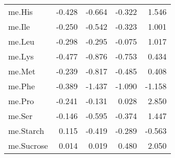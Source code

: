 \begin{tabular}{lrrrr}
me.His & {\cellcolor[HTML]{AAB8D0}} \color[HTML]{000000} -0.428 & {\cellcolor[HTML]{7997C1}} \color[HTML]{F1F1F1} -0.664 & {\cellcolor[HTML]{BFC8D8}} \color[HTML]{000000} -0.322 & {\cellcolor[HTML]{A9373B}} \color[HTML]{F1F1F1} 1.546 \\
me.Ile & {\cellcolor[HTML]{CFD4E0}} \color[HTML]{000000} -0.250 & {\cellcolor[HTML]{92A7C8}} \color[HTML]{F1F1F1} -0.542 & {\cellcolor[HTML]{BFC8D8}} \color[HTML]{000000} -0.323 & {\cellcolor[HTML]{A9373B}} \color[HTML]{F1F1F1} 1.001 \\
me.Leu & {\cellcolor[HTML]{C3CBDA}} \color[HTML]{000000} -0.298 & {\cellcolor[HTML]{C5CDDB}} \color[HTML]{000000} -0.295 & {\cellcolor[HTML]{F2F0F2}} \color[HTML]{000000} -0.075 & {\cellcolor[HTML]{A9373B}} \color[HTML]{F1F1F1} 1.017 \\
me.Lys & {\cellcolor[HTML]{9FB0CC}} \color[HTML]{000000} -0.477 & {\cellcolor[HTML]{4879BC}} \color[HTML]{F1F1F1} -0.876 & {\cellcolor[HTML]{658ABE}} \color[HTML]{F1F1F1} -0.753 & {\cellcolor[HTML]{D9A5A2}} \color[HTML]{000000} 0.434 \\
me.Met & {\cellcolor[HTML]{D0D5E0}} \color[HTML]{000000} -0.239 & {\cellcolor[HTML]{5782BC}} \color[HTML]{F1F1F1} -0.817 & {\cellcolor[HTML]{9DAFCB}} \color[HTML]{000000} -0.485 & {\cellcolor[HTML]{DAA9A7}} \color[HTML]{000000} 0.408 \\
me.Phe & {\cellcolor[HTML]{B2BED3}} \color[HTML]{000000} -0.389 & {\cellcolor[HTML]{2369BD}} \color[HTML]{F1F1F1} -1.437 & {\cellcolor[HTML]{2369BD}} \color[HTML]{F1F1F1} -1.090 & {\cellcolor[HTML]{2369BD}} \color[HTML]{F1F1F1} -1.158 \\
me.Pro & {\cellcolor[HTML]{D0D5E0}} \color[HTML]{000000} -0.241 & {\cellcolor[HTML]{E7E7EC}} \color[HTML]{000000} -0.131 & {\cellcolor[HTML]{FAF3F3}} \color[HTML]{000000} 0.028 & {\cellcolor[HTML]{A9373B}} \color[HTML]{F1F1F1} 2.850 \\
me.Ser & {\cellcolor[HTML]{E4E5EB}} \color[HTML]{000000} -0.146 & {\cellcolor[HTML]{87A0C4}} \color[HTML]{F1F1F1} -0.595 & {\cellcolor[HTML]{B5C0D4}} \color[HTML]{000000} -0.374 & {\cellcolor[HTML]{A9373B}} \color[HTML]{F1F1F1} 1.447 \\
me.Starch & {\cellcolor[HTML]{F5E5E4}} \color[HTML]{000000} 0.115 & {\cellcolor[HTML]{ABB9D0}} \color[HTML]{000000} -0.419 & {\cellcolor[HTML]{C5CDDB}} \color[HTML]{000000} -0.289 & {\cellcolor[HTML]{8DA4C6}} \color[HTML]{F1F1F1} -0.563 \\
me.Sucrose & {\cellcolor[HTML]{FAF5F4}} \color[HTML]{000000} 0.014 & {\cellcolor[HTML]{FAF4F3}} \color[HTML]{000000} 0.019 & {\cellcolor[HTML]{D59C99}} \color[HTML]{F1F1F1} 0.480 & {\cellcolor[HTML]{A9373B}} \color[HTML]{F1F1F1} 2.050 \\

\end{tabular}
